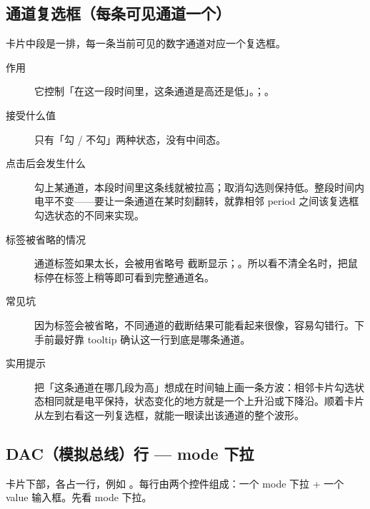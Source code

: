 \documentclass[11pt,oneside,openany]{book}
\begin{document}
\subsection{通道复选框（每条可见通道一个）}

卡片中段是一排，每一条当前可见的数字通道对应一个复选框。

\begin{description}
\item[作用] 它控制「在这一段时间里，这条通道是高还是低」。；。
\item[接受什么值] 只有「勾 / 不勾」两种状态，没有中间态。
\item[点击后会发生什么] 勾上某通道，本段时间里这条线就被拉高；取消勾选则保持低。整段时间内电平不变——要让一条通道在某时刻翻转，就靠相邻 period 之间该复选框勾选状态的不同来实现。
\item[标签被省略的情况] 通道标签如果太长，会被用省略号  截断显示；。所以看不清全名时，把鼠标停在标签上稍等即可看到完整通道名。
\item[常见坑] 因为标签会被省略，不同通道的截断结果可能看起来很像，容易勾错行。下手前最好靠 tooltip 确认这一行到底是哪条通道。
\item[实用提示] 把「这条通道在哪几段为高」想成在时间轴上画一条方波：相邻卡片勾选状态相同就是电平保持，状态变化的地方就是一个上升沿或下降沿。顺着卡片从左到右看这一列复选框，就能一眼读出该通道的整个波形。
\end{description}

\subsection{DAC（模拟总线）行 — mode 下拉}

卡片下部，各占一行，例如 。每行由两个控件组成：一个 mode 下拉 + 一个 value 输入框。先看 mode 下拉。
\end{document}

